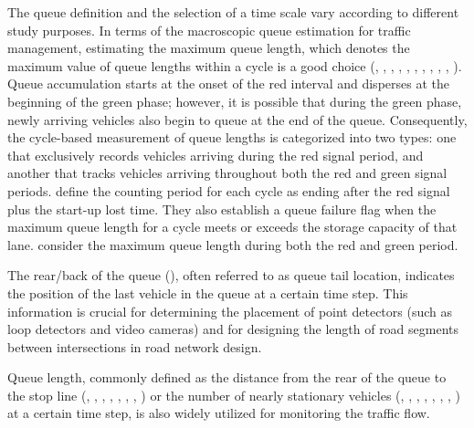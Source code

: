 The queue definition and the selection of a time scale vary according to different study purposes. In terms of the macroscopic queue estimation for traffic management, estimating the maximum queue length, which denotes the maximum value of queue lengths within a cycle is a good choice (\textcite{sharma2007input}, \textcite{liu2009real}, \textcite{cheng2012exploratory}, \textcite{cai2014shock}, \textcite{lee2015real}, \textcite{wang2015cycle}, \textcite{yin2018kalman}, \textcite{an2018real}, \textcite{gao2019connected}, \textcite{yao2019cycle}, \textcite{abewickrema2023multivariate}). Queue accumulation starts at the onset of the red interval and disperses at the beginning of the green phase; however, it is possible that during the green phase, newly arriving vehicles also begin to queue at the end of the queue. Consequently, the cycle-based measurement of queue lengths is categorized into two types: one that exclusively records vehicles arriving during the red signal period, and another that tracks vehicles arriving throughout both the red and green signal periods. \textcite{sharma2007input} define the counting period for each cycle as ending after the red signal plus the start-up lost time. They also establish a queue failure flag when the maximum queue length for a cycle meets or exceeds the storage capacity of that lane. \textcite{liu2009real} consider the maximum queue length during both the red and green period.

The rear/back of the queue (\textcite{hu2022high}), often referred to as queue tail location, indicates the position of the last vehicle in the queue at a certain time step. This information is crucial for determining the placement of point detectors (such as loop detectors and video cameras) and for designing the length of road segments between intersections in road network design. 

Queue length, commonly defined as the distance from the rear of the queue to the stop line 
(\textcite{ban2011real}, \textcite{cheng2011cycle}, \textcite{comert2013simple}, \textcite{ramezani2015queue}, \textcite{yang2018queue}, \textcite{wang2020queue}, \textcite{tan2020fuzing}, \textcite{ferencz2023road}) or the number of nearly stationary vehicles (\textcite{vigos2008real}, \textcite{vigos2010simplified}, \textcite{hao2014cycle}, \textcite{aljamal2020real}, \textcite{wang2021kalman}, \textcite{comert2021queue}, \textcite{anusha2022dynamical}, \textcite{ferencz2023road}) at a certain time step, is also widely utilized for monitoring the traffic flow. 

